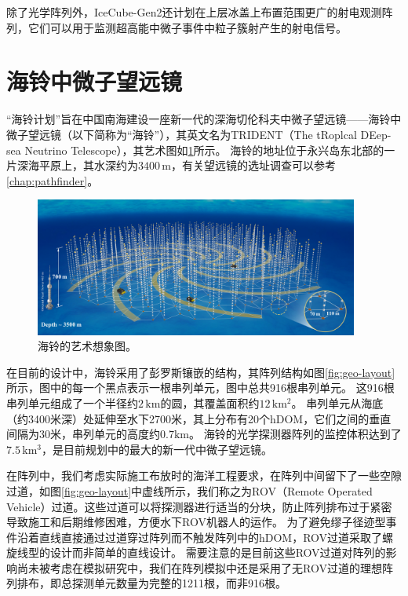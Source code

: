除了光学阵列外，IceCube-Gen2还计划在上层冰盖上布置范围更广的射电观测阵列，它们可以用于监测超高能中微子事件中粒子簇射产生的射电信号\cite{IceCube-Gen2_radio:2021}。


\section{海铃中微子望远镜}
\label{sec:TRIDENT_array}

“海铃计划”旨在中国南海建设一座新一代的深海切伦科夫中微子望远镜——海铃中微子望远镜（以下简称为“海铃”），其英文名为TRIDENT（The tRoplcal DEep-sea Neutrino Telescope），其艺术图如\ref{fig:TRIDENT_array}所示。
海铃的地址位于永兴岛东北部的一片深海平原上，其水深约为$3400\,\mathrm{m}$，有关望远镜的选址调查可以参考\ref{chap:pathfinder}。

\begin{figure}[!htb]%
    \centering
    \includegraphics[width=0.95\textwidth]{img/TRIDENT_array.jpeg}
    \caption{海铃的艺术想象图。}
    \label{fig:TRIDENT_array}
\end{figure}

在目前的设计中，海铃采用了彭罗斯镶嵌的结构，其阵列结构如图\ref{fig:geo-layout}所示，图中的每一个黑点表示一根串列单元，图中总共916根串列单元。
这916根串列单元组成了一个半径约$2\,\mathrm{km}$的圆，其覆盖面积约$12\,\mathrm{km^2}$。
串列单元从海底（约3400米深）处延伸至水下2700米，其上分布有20个hDOM，它们之间的垂直间隔为30米，串列单元的高度约$0.7\mathrm{km}$。
海铃的光学探测器阵列的监控体积达到了$7.5\,\mathrm{km^3}$，是目前规划中的最大的新一代中微子望远镜。

在阵列中，我们考虑实际施工布放时的海洋工程要求，在阵列中间留下了一些空隙过道，如图\ref{fig:geo-layout}中虚线所示，我们称之为ROV（Remote Operated Vehicle）过道。这些过道可以将探测器进行适当的分块，防止阵列排布过于紧密导致施工和后期维修困难，方便水下ROV机器人的运作。
为了避免缪子径迹型事件沿着直线直接通过过道穿过阵列而不触发阵列中的hDOM，ROV过道采取了螺旋线型的设计而非简单的直线设计。
需要注意的是目前这些ROV过道对阵列的影响尚未被考虑在模拟研究中，我们在阵列模拟中还是采用了无ROV过道的理想阵列排布，即总探测单元数量为完整的1211根，而非916根。


